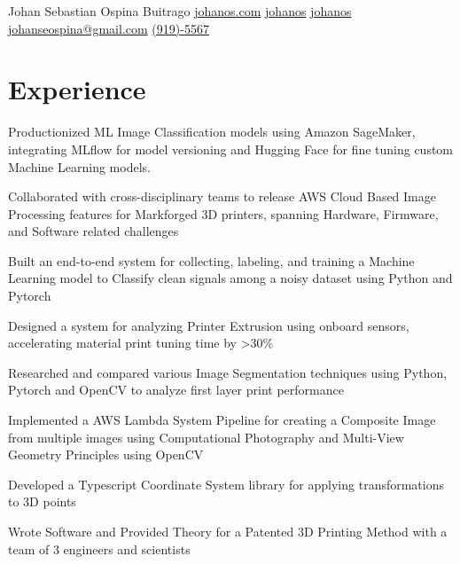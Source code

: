 \documentclass[]{plushcv}
\begin{document}
%
%
    
\namesection
{Johan Sebastian }
{Ospina Buitrago}
{}
{
    \contactline
    {\href{https://www.johanos.com}{johanos.com}}
    {\href{https://www.github.com/johanos}{johanos}}
    {\href{https://www.linkedin.com/in/johanos}
        {johanos}}
    {\href{mailto:johanseospina@gmail.com}{johanseospina@gmail.com}}
    {\href{tel:+1 (919) 946-5567}{(919)-5567}}
}

%
%

\begin{minipage}[t]{0.70\textwidth}



    \section{Experience}
    \vspace{\topsep} %
    \begin{tightemize}
        \sectionsep
        \item Productionized ML Image Classification models using Amazon SageMaker, integrating MLflow for model versioning and Hugging Face for fine tuning custom Machine Learning models.
        \item Collaborated with cross-disciplinary teams to release AWS Cloud Based Image Processing features for Markforged 3D printers, spanning Hardware, Firmware, and Software related challenges
        \item Built an end-to-end system for collecting, labeling, and training a Machine Learning model to Classify clean signals among a noisy dataset using Python and Pytorch
        \item Designed a system for analyzing Printer Extrusion using onboard sensors, accelerating material print tuning time by >30\%
        \item Researched and compared various Image Segmentation techniques using Python, Pytorch and OpenCV to analyze first layer print performance
        \item Implemented a AWS Lambda System Pipeline for creating a Composite Image from multiple images using Computational Photography and Multi-View Geometry Principles using OpenCV
        \item Developed a Typescript Coordinate System library for applying transformations to 3D points
        \item Wrote Software and Provided Theory for a Patented 3D Printing Method with a team of 3 engineers and scientists
    \end{tightemize}
    \sectionsep


\end{minipage}
\end{document}
